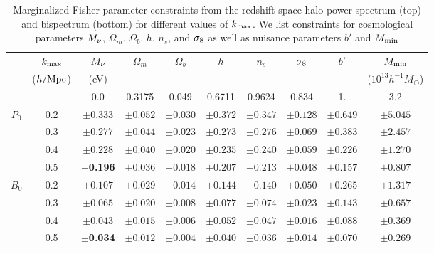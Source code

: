 \begin{table}
    \caption{Marginalized Fisher parameter constraints from the redshift-space halo power 
    spectrum (top) and bispectrum (bottom) for different values of $k_{\rm max}$. We list 
    constraints for cosmological parameters $M_\nu$, $\Omega_m$, $\Omega_b$, $h$, $n_s$, 
    and $\sigma_8$ as well as nuisance parameters $b'$ and $M_{\rm min}$} 
\begin{center} 
    \begin{tabular}{cccccccccc} \toprule
         & $k_{\rm max}$ & $M_\nu$ & $\Omega_m$ & $\Omega_b$ & $h$ & $n_s$ & $\sigma_8$ & $b'$ & $M_{\rm min}$ \\
         & ({\footnotesize $h/{\rm Mpc}$}) &({\footnotesize eV}) & & & & & & & ({\footnotesize $10^{13} h^{-1}M_\odot$}) \\[3pt] \hline\hline

            &     & 0.0 & 0.3175 & 0.049 & 0.6711 & 0.9624 & 0.834 & 1. & 3.2  \\ 
    $P_0$  & 0.2 &$\pm0.333$ & $\pm0.052$ & $\pm0.030$ & $\pm0.372$ & $\pm0.347$ & $\pm0.128$ & $\pm0.649$ & $\pm5.045$\\
           & 0.3 &$\pm0.277$ & $\pm0.044$ & $\pm0.023$ & $\pm0.273$ & $\pm0.276$ & $\pm0.069$ & $\pm0.383$ & $\pm2.457$\\
           & 0.4 &$\pm0.228$ & $\pm0.040$ & $\pm0.020$ & $\pm0.235$ & $\pm0.240$ & $\pm0.059$ & $\pm0.226$ & $\pm1.270$\\
           & 0.5 &$\pm${\bf 0.196}& $\pm0.036$ & $\pm0.018$ & $\pm0.207$ & $\pm0.213$ & $\pm0.048$ & $\pm0.157$ & $\pm0.807$\\\hline
                   
    $B_0$  & 0.2 &$\pm0.107$ & $\pm0.029$ & $\pm0.014$ & $\pm0.144$ & $\pm0.140$ & $\pm0.050$ & $\pm0.265$ & $\pm1.317$\\
           & 0.3 &$\pm0.065$ & $\pm0.020$ & $\pm0.008$ & $\pm0.077$ & $\pm0.074$ & $\pm0.023$ & $\pm0.143$ & $\pm0.657$\\
           & 0.4 &$\pm0.043$ & $\pm0.015$ & $\pm0.006$ & $\pm0.052$ & $\pm0.047$ & $\pm0.016$ & $\pm0.088$ & $\pm0.369$\\
           & 0.5 &$\pm${\bf 0.034}& $\pm0.012$ & $\pm0.004$ & $\pm0.040$ & $\pm0.036$ & $\pm0.014$ & $\pm0.070$ & $\pm0.269$\\[3pt]

    \hline
\end{tabular} \label{tab:forecast}
\end{center}
\end{table}

